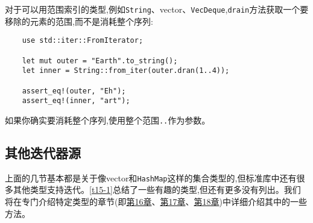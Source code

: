 对于可以用范围索引的类型,例如\texttt{String}、vector、\texttt{VecDeque},\texttt{drain}方法获取一个要移除的元素的范围,而不是消耗整个序列:
\begin{verbatim}
    use std::iter::FromIterator;

    let mut outer = "Earth".to_string();
    let inner = String::from_iter(outer.dran(1..4));

    assert_eq!(outer, "Eh");
    assert_eq!(inner, "art");
\end{verbatim}

如果你确实要消耗整个序列,使用整个范围\texttt{..}作为参数。

\subsection{其他迭代器源}
上面的几节基本都是关于像vector和\texttt{HashMap}这样的集合类型的,但标准库中还有很多其他类型支持迭代。\autoref{t15-1}总结了一些有趣的类型,但还有更多没有列出。我们将在专门介绍特定类型的章节(即\hyperref[ch16]{第16章}、\hyperref[ch17]{第17章}、\hyperref[ch18]{第18章})中详细介绍其中的一些方法。

